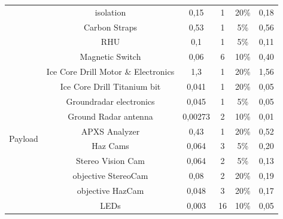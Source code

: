 \begin{table}[]
{\begin{tabular}{cccccc}
                                         & isolation                           & 0,15                        & 1        & 20\%             & 0,18           \\
                                         & Carbon Straps                       & 0,53                        & 1        & 5\%              & 0,56           \\
                                         & RHU                                 & 0,1                         & 1        & 5\%              & 0,11           \\
                                         & Magnetic Switch                     & 0,06                        & 6        & 10\%             & 0,40           \\
\multirow{10}{*}{Payload}                & Ice Core Drill Motor \& Electronics & 1,3                         & 1        & 20\%             & 1,56           \\
                                         & Ice Core Drill Titanium bit         & 0,041                       & 1        & 20\%             & 0,05           \\
                                         & Groundradar electronics             & 0,045                       & 1        & 5\%              & 0,05           \\
                                         & Ground Radar antenna                & 0,00273                     & 2        & 10\%             & 0,01           \\
                                         & APXS Analyzer                       & 0,43                        & 1        & 20\%             & 0,52           \\
                                         & Haz Cams                            & 0,064                       & 3        & 5\%              & 0,20           \\
                                         & Stereo Vision Cam                   & 0,064                       & 2        & 5\%              & 0,13           \\
                                         & objective StereoCam                 & 0,08                        & 2        & 20\%             & 0,19           \\
                                         & objective HazCam                    & 0,048                       & 3        & 20\%             & 0,17           \\
                                         & LEDs                                & 0,003                       & 16       & 10\%             & 0,05           \\

\end{tabular}}
\end{table}
